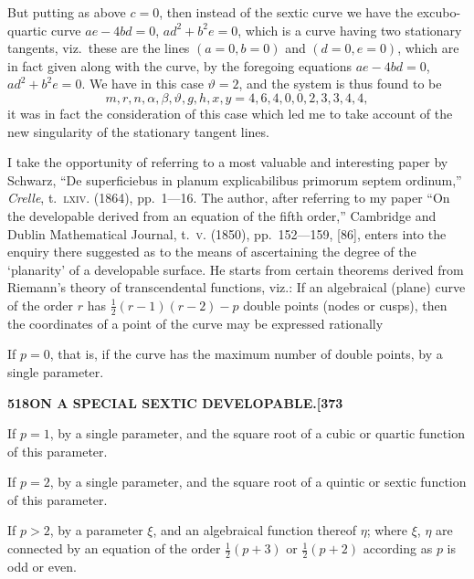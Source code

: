 \documentclass[11pt,a4paper]{article}
\begin{document}
But putting as above $c = 0$, then instead of the sextic curve we have the excubo-quartic curve $ae - 4bd = 0$, $ad^{2} + b^{2}e = 0$, which is a curve having two stationary tangents, viz.~these are the lines $(a = 0, b = 0)$ and $(d = 0, e = 0)$, which are in fact given along with the curve, by the foregoing equations $ae - 4bd = 0$, $ad^{2} + b^{2}e = 0$. We have in this case $\vartheta = 2$, and the system is thus found to be
\[
m, r, n, \alpha, \beta, \vartheta, g, h, x, y = 4, 6, 4, 0, 0, 2, 3, 3, 4, 4,
\]
it was in fact the consideration of this case which led me to take account of the new singularity of the stationary tangent lines.

I take the opportunity of referring to a most valuable and interesting paper by Schwarz, ``De superficiebus in planum explicabilibus primorum septem ordinum,'' \textit{Crelle}, t.~\textsc{lxiv}. (1864), pp.~1---16. The author, after referring to my paper ``On the developable derived from an equation of the fifth order,'' Cambridge and Dublin Mathematical Journal, t.~\textsc{v}. (1850), pp.~152---159, [86], enters into the enquiry there suggested as to the means of ascertaining the degree of the `planarity' of a developable surface. He starts from certain theorems derived from Riemann's theory of transcendental functions, viz.: If an algebraical (plane) curve of the order $r$ has $\tfrac{1}{2}(r - 1)(r - 2) - p$ double points (nodes or cusps), then the coordinates of a point of the curve may be expressed rationally

If $p = 0$, that is, if the curve has the maximum number of double points, by a single parameter.

\newpage
\noindent\textbf{518\hspace{1em}ON A SPECIAL SEXTIC DEVELOPABLE.\hfill[373}

\vspace{12pt}

\noindent
If $p = 1$, by a single parameter, and the square root of a cubic or quartic function of this parameter.

If $p = 2$, by a single parameter, and the square root of a quintic or sextic function of this parameter.

If $p > 2$, by a parameter $\xi$, and an algebraical function thereof $\eta$; where $\xi$, $\eta$ are connected by an equation of the order $\tfrac{1}{2}(p + 3)$ or $\tfrac{1}{2}(p + 2)$ according as $p$ is odd or even.
\end{document}
